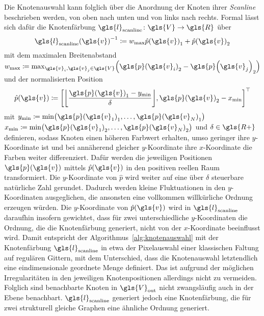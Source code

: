 Die Knotenauswahl kann folglich über die Anordnung der Knoten \bzgl{} ihrer \emph{Scanline} beschrieben werden, \dhe{} von oben nach unten und von links nach rechts.
Formal lässt sich dafür die Knotenfärbung $\gls{l}_{\mathrm{scanline}} \colon \gls{V} \to \gls{R}$ über
\begin{equation*}
  {\gls{l}_{\mathrm{scanline}}\left(\gls{v}\right)}^{-1} \coloneqq w_{\max} {\hat p\left(\gls{v}\right)}_1 + {\hat p\left(\gls{v}\right)}_2
\end{equation*}
mit dem maximalen Breitenabstand $w_{\max} \coloneqq \max_{\gls{v}_i, \gls{v}_j \in \gls{V}} \left({\gls{p}\left(\gls{v}_i\right)}_2 - {\gls{p}\left(\gls{v}_j\right)}_2 \right)$ und der normalisierten Position
\begin{equation*}
  \hat p\left(\gls{v}\right) \coloneqq {\left[\left\lfloor\frac{{\gls{p}\left(\gls{v}\right)}_1 - y_{\min}}{\delta} \right\rfloor, {\gls{p}\left(\gls{v}\right)}_2 - x_{\min}\right]}^{\top}
\end{equation*}
mit $y_{\min} \coloneqq \min \left({\gls{p}\left(\gls{v}_1\right)}_1, \ldots, {\gls{p}\left(\gls{v}_N\right)}_1\right)$ \bzw{} $x_{\min} \coloneqq \min \left({\gls{p}\left(\gls{v}_1\right)}_2, \ldots, {\gls{p}\left(\gls{v}_N\right)}_2\right)$ und $\delta \in \gls{R+}$ definieren, sodass Knoten einen höheren Farbwert erhalten, umso geringer ihre $y$-Koordinate ist und bei annäherend gleicher $y$-Koordinate ihre $x$-Koordinate die Farben weiter differenziert.
Dafür werden die jeweiligen Positionen $\gls{p}\left(\gls{v}\right)$ mittels $\hat p\left(\gls{v}\right)$ in den positiven reellen Raum transformiert.
Die $y$-Koordinate von $\hat p$ wird weiter auf eine über $\delta$ steuerbare natürliche Zahl gerundet.
Dadurch werden kleine Fluktuationen in den $y$-Koordinaten ausgeglichen, die ansonsten eine vollkommen willkürliche Ordnung erzeugen würden.
Die $y$-Koordinate von $\hat p\left(\gls{v}\right)$ wird in $\gls{l}_{\mathrm{scanline}}$ daraufhin insofern gewichtet, dass für zwei unterschiedliche $y$-Koordinaten die Ordnung, die die Knotenfärbung generiert, nicht von der $x$-Koordinate beeinflusst wird.
Damit entspricht der Algorithmus~\ref{alg:knotenauswahl} mit der Knotenfärbung $\gls{l}_{\mathrm{scanline}}$ in etwa der Pixelauswahl einer klassischen Faltung auf regulären Gittern, mit dem Unterschied, dass die Knotenauswahl letztendlich eine eindimensionale geordnete Menge definiert.
Das ist aufgrund der möglichen Irregularitäten in den jeweiligen Knotenpositionen allerdings nicht zu vermeiden.
Folglich sind benachbarte Knoten in $\gls{V}_{\mathrm{out}}$ nicht zwangsläufig auch in der Ebene benachbart.
$\gls{l}_{\mathrm{scanline}}$ generiert jedoch eine Knotenfärbung, die für zwei strukturell gleiche Graphen eine ähnliche Ordnung generiert.

